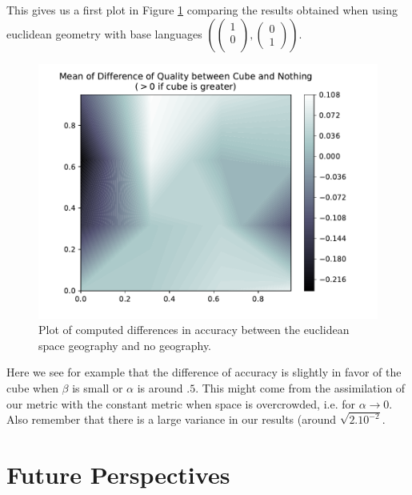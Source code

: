 \documentclass[math, info, english]{cours}
\begin{document}
This gives us a first plot in Figure \ref{cubenone} comparing the results obtained when using euclidean geometry with base languages $\left( \begin{pmatrix}
	1\\
	0\\
\end{pmatrix}, \begin{pmatrix}
	0\\
	1
\end{pmatrix}\right)$.
\begin{figure}[h]
	\centering
	\includegraphics[width=\textwidth]{../Figures/qual_diff_cube_none}
	\caption{Plot of computed differences in accuracy between the euclidean space geography and no geography.}
	\label{cubenone}
\end{figure}

Here we see for example that the difference of accuracy is slightly in favor of the cube when $\beta$ is small or $\alpha$ is around $.5$.
This might come from the assimilation of our metric with the constant metric when space is overcrowded, i.e. for $\alpha \to 0$.
Also remember that there is a large variance in our results (around $\sqrt{2.10^{-2}}$.

\section{Future Perspectives}




\appendix


\end{document}
